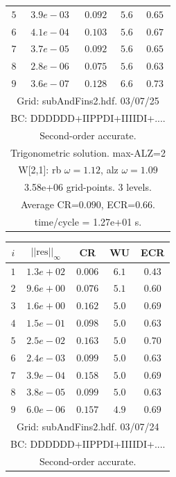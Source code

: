 \begin{table}[hbt]
\begin{center}
{\begin{tabular}{|c|c|c|c|c|}
 $ 5$  & $ 3.9e-03$ & $0.092$ & $ 5.6$ & $0.65$ \\ 
 $ 6$  & $ 4.1e-04$ & $0.103$ & $ 5.6$ & $0.67$ \\ 
 $ 7$  & $ 3.7e-05$ & $0.092$ & $ 5.6$ & $0.65$ \\ 
 $ 8$  & $ 2.8e-06$ & $0.075$ & $ 5.6$ & $0.63$ \\ 
 $ 9$  & $ 3.6e-07$ & $0.128$ & $ 6.6$ & $0.73$ \\ 
\hline 
\multicolumn{5}{|c|}{Grid: subAndFins2.hdf. 03/07/25}  \\
\multicolumn{5}{|c|}{BC: DDDDDD+IIPPDI+IIIIDI+....}  \\
\multicolumn{5}{|c|}{Second-order accurate.}  \\
\multicolumn{5}{|c|}{Trigonometric solution. max-ALZ=2}  \\
\multicolumn{5}{|c|}{W[2,1]: rb $\omega=1.12$, alz $\omega=1.09$}  \\
\multicolumn{5}{|c|}{3.58e+06 grid-points. 3 levels.}  \\
\multicolumn{5}{|c|}{Average CR=$0.090$, ECR=$0.66$.}  \\
\multicolumn{5}{|c|}{time/cycle = 1.27e+01 s.}  \\
\hline 
\end{tabular}
\begin{tabular}{|c|c|c|c|c|} \hline 
 $i$   & $\vert\vert\mbox{res}\vert\vert_\infty$  &  CR     &  WU    & ECR  \\   \hline 
 $ 1$  & $ 1.3e+02$ & $0.006$ & $ 6.1$ & $0.43$ \\ 
 $ 2$  & $ 9.6e+00$ & $0.076$ & $ 5.1$ & $0.60$ \\ 
 $ 3$  & $ 1.6e+00$ & $0.162$ & $ 5.0$ & $0.69$ \\ 
 $ 4$  & $ 1.5e-01$ & $0.098$ & $ 5.0$ & $0.63$ \\ 
 $ 5$  & $ 2.5e-02$ & $0.163$ & $ 5.0$ & $0.70$ \\ 
 $ 6$  & $ 2.4e-03$ & $0.099$ & $ 5.0$ & $0.63$ \\ 
 $ 7$  & $ 3.9e-04$ & $0.158$ & $ 5.0$ & $0.69$ \\ 
 $ 8$  & $ 3.8e-05$ & $0.099$ & $ 5.0$ & $0.63$ \\ 
 $ 9$  & $ 6.0e-06$ & $0.157$ & $ 4.9$ & $0.69$ \\ 
\hline 
\multicolumn{5}{|c|}{Grid: subAndFins2.hdf. 03/07/24}  \\
\multicolumn{5}{|c|}{BC: DDDDDD+IIPPDI+IIIIDI+....}  \\
\multicolumn{5}{|c|}{Second-order accurate.}  \\

\end{tabular}}
\end{center}
\end{table}
